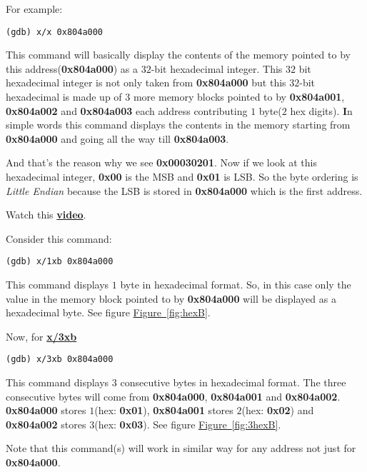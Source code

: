 \documentclass{article}
\begin{document}
For example:
\begin{Verbatim}[frame=single]
(gdb) x/x 0x804a000
\end{Verbatim}

This command will basically display the contents of the memory pointed to by this address(\textbf{0x804a000}) as a $32$-bit hexadecimal integer. This $32$ bit hexadecimal integer is not only taken from \textbf{0x804a000} but this $32$-bit hexadecimal is made up of $3$ more memory blocks pointed to by \textbf{0x804a001}, \textbf{0x804a002} and \textbf{0x804a003} each address contributing $1$ byte($2$ hex digits). \textbf{I}n simple words this command displays the contents in the memory starting from \textbf{0x804a000} and going all the way till \textbf{0x804a003}.

And that's the reason why we see \textbf{0x00030201}. Now if we look at this hexadecimal integer, \textbf{0x00} is the MSB and \textbf{0x01} is LSB. So the byte ordering is \textit{Little Endian} because the LSB is stored in \textbf{0x804a000} which is the first address. 

Watch this \href{https://www.youtube.com/watch?v=jhErugDB-34}{\textbf{video}}.

\vspace{5pt}

Consider this command:
\begin{Verbatim}[frame=single]
(gdb) x/1xb 0x804a000
\end{Verbatim}

This command displays $1$ byte in hexadecimal format. So, in this case only the value in the memory block pointed to by \textbf{0x804a000} will be displayed as a hexadecimal byte. See figure \hyperref[fig:hexB]{Figure~\ref*{fig:hexB}}.

\vspace{10pt}
Now, for \underline{\textbf{x/3xb}}

\begin{Verbatim}[frame=single]
(gdb) x/3xb 0x804a000
\end{Verbatim}

This command displays $3$ consecutive bytes in hexadecimal format. The three consecutive bytes will come from \textbf{0x804a000}, \textbf{0x804a001} and \textbf{0x804a002}. \textbf{0x804a000} stores $1$(hex: \textbf{0x01}), \textbf{0x804a001} stores $2$(hex: \textbf{0x02}) and \textbf{0x804a002} stores $3$(hex: \textbf{0x03}). See figure \hyperref[fig:3hexB]{Figure~\ref*{fig:3hexB}}.

\vspace{5pt}
Note that this command(s) will work in similar way for any address not just for \textbf{0x804a000}.
\end{document}
